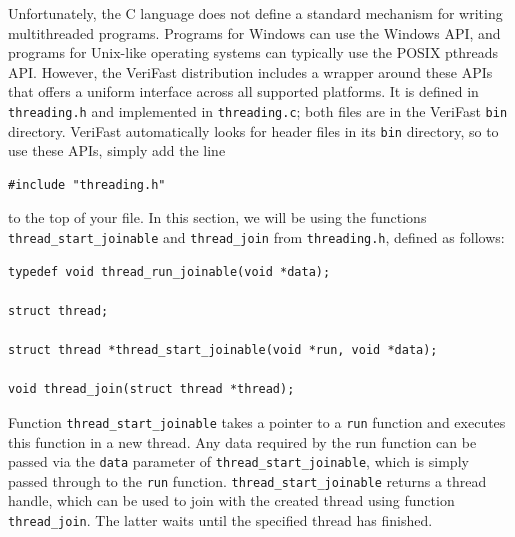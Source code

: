 \documentclass{article}
\begin{document}
Unfortunately, the C language does not define a standard
mechanism for writing multithreaded programs. Programs for
Windows can use the Windows API, and programs for Unix-like
operating systems can typically use the POSIX pthreads API.
However, the VeriFast distribution includes a wrapper around
these APIs that offers a uniform interface across all supported
platforms. It is defined in \texttt{threading.h} and
implemented in \texttt{threading.c}; both files are in the
VeriFast \texttt{bin} directory. VeriFast automatically looks
for header files in its \texttt{bin} directory, so to use these
APIs, simply add the line
\begin{lstlisting}
#include "threading.h"
\end{lstlisting}
to the top of your file. In this section, we will be using the
functions \lstinline!thread_start_joinable! and \lstinline!thread_join!
from \texttt{threading.h}, defined as follows:
\begin{lstlisting}
typedef void thread_run_joinable(void *data);

struct thread;

struct thread *thread_start_joinable(void *run, void *data);

void thread_join(struct thread *thread);
\end{lstlisting}
Function \lstinline!thread_start_joinable! takes a pointer to a
\lstinline!run! function and executes this function in a new
thread. Any data required by the run function can be passed via
the \lstinline!data! parameter of \lstinline!thread_start_joinable!,
which is simply passed through to the \lstinline!run! function.
\lstinline!thread_start_joinable! returns a thread handle, which can be
used to join with the created thread using function
\lstinline!thread_join!. The latter waits until the specified
thread has finished.
\end{document}

